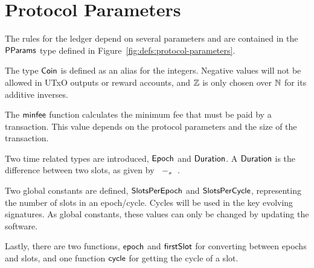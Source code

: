 \section{Protocol Parameters}
\label{sec:protocol-parameters}

The rules for the ledger depend on several parameters and are contained in the $\mathsf{PParams}$ type
defined in Figure~\ref{fig:defs:protocol-parameters}.

The type $\mathsf{Coin}$ is defined as an alias for the integers.
Negative values will not be allowed in UTxO outputs or reward accounts,
and $\mathbb{Z}$ is only chosen over $\mathbb{N}$ for its additive inverses.

The $\mathsf{minfee}$ function calculates the minimum fee that must be paid by a transaction.
This value depends on the protocol parameters and the size of the transaction.

Two time related types are introduced, $\mathsf{Epoch}$ and $\mathsf{Duration}$.
A $\mathsf{Duration}$ is the difference between two slots, as given by $\mathit{}~-_{s}~\mathit{}$.

Two global constants are defined,
$\mathsf{SlotsPerEpoch}$ and $\mathsf{SlotsPerCycle}$, representing the number of slots in an epoch/cycle.
Cycles will be used in the key evolving signatures.
As global constants, these values can only be changed by updating the software.

Lastly, there are two functions, $\mathsf{epoch}$ and $\mathsf{firstSlot}$ for converting
between epochs and slots, and one function $\mathsf{cycle}$ for getting the cycle of a slot.

